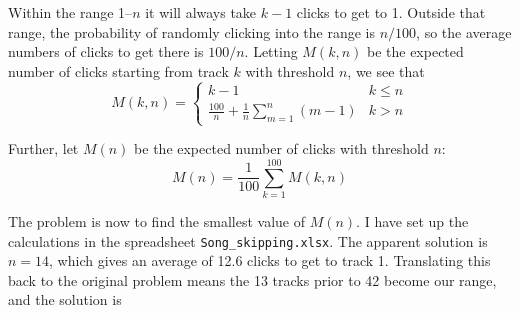 \documentclass{article}
\begin{document}
Within the range 1--$n$ it will always take $k-1$ clicks to get to 1.
Outside that range, the probability of randomly clicking into the range is $n/100$, so the average numbers of clicks to get there is $100/n$.
Letting $M(k,n)$ be the expected number of clicks starting from track $k$ with threshold $n$, we see that
\begin{equation*}
M(k,n)=
\begin{cases}
k-1 & k\leq n \\
\frac{100}{n}+\frac{1}{n}\sum\limits_{m=1}^{n}(m-1) & k>n
\end{cases}
\end{equation*}

Further, let $M(n)$ be the expected number of clicks with threshold $n$:
\begin{equation*}
M(n)=\frac{1}{100}\sum\limits_{k=1}^{100}M(k,n)
\end{equation*}

The problem is now to find the smallest value of $M(n)$.
I have set up the calculations in the spreadsheet \texttt{Song\_skipping.xlsx}.
The apparent solution is $n=14$, which gives an average of 12.6 clicks to get to track 1.
Translating this back to the original problem means the 13 tracks prior to 42 become our range, and the solution is
\end{document}
